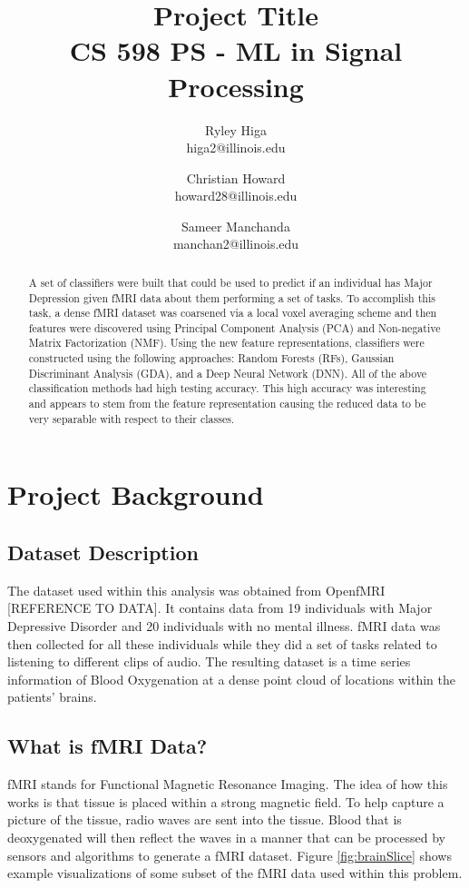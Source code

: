 \documentclass{article}[12pt]
\title{Project Title \\ CS 598 PS - ML in Signal Processing}
\author{
Ryley Higa \\ higa2@illinois.edu
\and 
Christian Howard \\ howard28@illinois.edu
\and
Sameer Manchanda \\ manchan2@illinois.edu
}
\date{} %
\begin{document}
   
   \maketitle
   \begin{abstract}
   A set of classifiers were built that could be used to predict if an individual has Major Depression given fMRI data about them performing a set of tasks. To accomplish this task, a dense fMRI dataset was coarsened via a local voxel averaging scheme and then features were discovered using Principal Component Analysis (PCA) and Non-negative Matrix Factorization (NMF). Using the new feature representations, classifiers were constructed using the following approaches: Random Forests (RFs), Gaussian Discriminant Analysis (GDA), and a Deep Neural Network (DNN). All of the above classification methods had high testing accuracy. This high accuracy was interesting and appears to stem from the feature representation causing the reduced data to be very separable with respect to their classes.
   \end{abstract}
   \newpage
   
   \tableofcontents
   \newpage
   
   \section{Project Background}
   \subsection{Dataset Description}
   The dataset used within this analysis was obtained from OpenfMRI [REFERENCE TO DATA]. It contains data from 19 individuals with Major Depressive Disorder and 20 individuals with no mental illness. fMRI data was then collected for all these individuals while they did a set of tasks related to listening to different clips of audio. The resulting dataset is a time series information of Blood Oxygenation at a dense point cloud of locations within the patients’ brains.
   
   \subsection{What is fMRI Data?}
   fMRI stands for Functional Magnetic Resonance Imaging. The idea of how this works is that tissue is placed within a strong magnetic field. To help capture a picture of the tissue, radio waves are sent into the tissue. Blood that is deoxygenated will then reflect the waves in a manner that can be processed by sensors and algorithms to generate a fMRI dataset. Figure \ref{fig:brainSlice} shows example visualizations of some subset of the fMRI data used within this problem.
   
\end{document}
